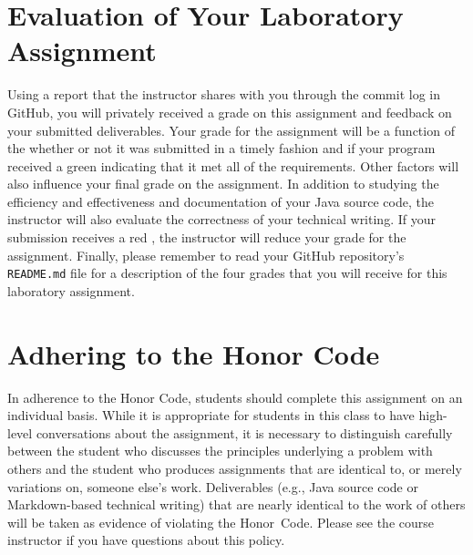 \documentclass[11pt]{article}
\newcommand{\program}[1]{\lstinline{#1}}
\newcommand{\checkmark}{\ding{51}}
\newcommand{\naughtmark}{\ding{55}}
\begin{document}
\section*{Evaluation of Your Laboratory Assignment}

Using a report that the instructor shares with you through the commit log in
GitHub, you will privately received a grade on this assignment and feedback on
your submitted deliverables. Your grade for the assignment will be a function of
the whether or not it was submitted in a timely fashion and if your program
received a green \checkmark{} indicating that it met all of the requirements.
Other factors will also influence your final grade on the assignment. In
addition to studying the efficiency and effectiveness and documentation of your
Java source code, the instructor will also evaluate the correctness of your
technical writing. If your submission receives a red \naughtmark{}, the
instructor will reduce your grade for the assignment. Finally, please remember
to read your GitHub repository's \program{README.md} file for a description of
the four grades that you will receive for this laboratory assignment.

\section*{Adhering to the Honor Code}

In adherence to the Honor Code, students should complete this assignment on an
individual basis. While it is appropriate for students in this class to have
high-level conversations about the assignment, it is necessary to distinguish
carefully between the student who discusses the principles underlying a problem
with others and the student who produces assignments that are identical to, or
merely variations on, someone else's work. Deliverables (e.g., Java source code
or Markdown-based technical writing) that are nearly identical to the work of
others will be taken as evidence of violating the \mbox{Honor Code}. Please see
the course instructor if you have questions about this policy.
\end{document}
